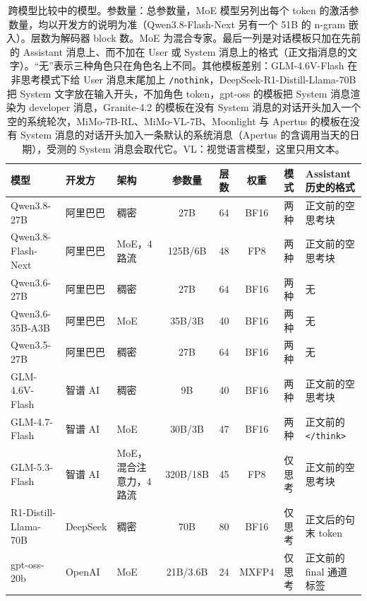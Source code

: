 
\begin{table}[htbp]
\centering
\caption{跨模型比较中的模型。参数量：总参数量，MoE 模型另列出每个 token 的激活参数量，均以开发方的说明为准（Qwen3.8-Flash-Next 另有一个 51B 的 n-gram 嵌入）。层数为解码器 block 数。MoE 为混合专家。最后一列是对话模板只加在先前的 Assistant 消息上、而不加在 User 或 System 消息上的格式（正文指消息的文字）。“无”表示三种角色只在角色名上不同。其他模板差别：GLM-4.6V-Flash 在非思考模式下给 User 消息末尾加上 \texttt{/nothink}，DeepSeek-R1-Distill-Llama-70B 把 System 文字放在输入开头，不加角色 token，gpt-oss 的模板把 System 消息渲染为 developer 消息，Granite-4.2 的模板在没有 System 消息的对话开头加入一个空的系统轮次，MiMo-7B-RL、MiMo-VL-7B、Moonlight 与 Apertus 的模板在没有 System 消息的对话开头加入一条默认的系统消息（Apertus 的含调用当天的日期），受测的 System 消息会取代它。VL：视觉语言模型，这里只用文本。}
\label{tab:self_models}
\scriptsize
\setlength{\tabcolsep}{2.6pt}
\begin{tabular}{ll>{\raggedright\arraybackslash}p{1.9cm}cccl>{\raggedright\arraybackslash}p{2.8cm}}
\toprule
模型 & 开发方 & 架构 & 参数量 & 层数 & 权重 & 模式 & Assistant 历史的格式 \\
\midrule
Qwen3.8-27B & 阿里巴巴 & 稠密 & 27B & 64 & BF16 & 两种 & 正文前的空思考块 \\
Qwen3.8-Flash-Next & 阿里巴巴 & MoE，4 路流 & 125B/6B & 48 & FP8 & 两种 & 正文前的空思考块 \\
Qwen3.6-27B & 阿里巴巴 & 稠密 & 27B & 64 & BF16 & 两种 & 无 \\
Qwen3.6-35B-A3B & 阿里巴巴 & MoE & 35B/3B & 40 & BF16 & 两种 & 无 \\
Qwen3.5-27B & 阿里巴巴 & 稠密 & 27B & 64 & BF16 & 两种 & 无 \\
GLM-4.6V-Flash & 智谱 AI & 稠密 & 9B & 40 & BF16 & 两种 & 正文前的空思考块 \\
GLM-4.7-Flash & 智谱 AI & MoE & 30B/3B & 47 & BF16 & 两种 & 正文前的 \texttt{</think>} \\
GLM-5.3-Flash & 智谱 AI & MoE，混合注意力，4 路流 & 320B/18B & 45 & FP8 & 仅思考 & 正文前的空思考块 \\
R1-Distill-Llama-70B & DeepSeek & 稠密 & 70B & 80 & BF16 & 仅思考 & 正文后的句末 token \\
gpt-oss-20b & OpenAI & MoE & 21B/3.6B & 24 & MXFP4 & 仅思考 & 正文前的 final 通道标签 \\

\end{tabular}
\end{table}
